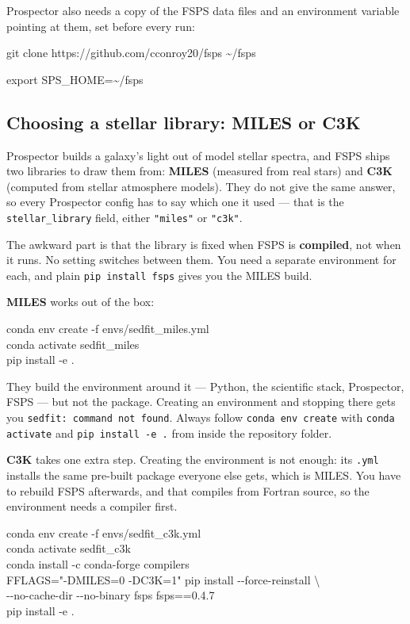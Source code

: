 \documentclass[11pt]{article}
\newcommand{\cmdline}[1]{\begin{cmd}\ttfamily #1\end{cmd}}
\begin{document}
Prospector also needs a copy of the FSPS data files and an environment
variable pointing at them, set before every run:

\cmdline{git clone https://github.com/cconroy20/fsps \textasciitilde/fsps}

\cmdline{export SPS\_HOME=\textasciitilde/fsps}

\subsection{Choosing a stellar library: MILES or C3K}

Prospector builds a galaxy's light out of model stellar spectra, and
FSPS ships two libraries to draw them from: \textbf{MILES} (measured
from real stars) and \textbf{C3K} (computed from stellar atmosphere
models). They do not give the same answer, so every Prospector config
has to say which one it used --- that is the \texttt{stellar\_library}
field, either \texttt{"miles"} or \texttt{"c3k"}.

The awkward part is that the library is fixed when FSPS is
\textbf{compiled}, not when it runs. No setting switches between them.
You need a separate environment for each, and plain
\texttt{pip install fsps} gives you the MILES build.

\textbf{MILES} works out of the box:

\begin{cmd}\ttfamily
conda env create -f envs/sedfit\_miles.yml\\
conda activate sedfit\_miles\\
pip install -e .
\end{cmd}

\begin{warnbox}
They build the environment around it --- Python, the scientific stack,
Prospector, FSPS --- but not the package. Creating an environment and
stopping there gets you \texttt{sedfit: command not found}. Always
follow \texttt{conda env create} with \texttt{conda activate} and
\texttt{pip install -e .} from inside the repository folder.
\end{warnbox}

\textbf{C3K} takes one extra step. Creating the environment is not
enough: its \texttt{.yml} installs the same pre-built package everyone
else gets, which is MILES. You have to rebuild FSPS afterwards, and that
compiles from Fortran source, so the environment needs a compiler first.

\begin{cmd}\ttfamily
conda env create -f envs/sedfit\_c3k.yml\\
conda activate sedfit\_c3k\\
conda install -c conda-forge compilers\\
FFLAGS="-DMILES=0 -DC3K=1" pip install -{}-force-reinstall \textbackslash\\
\hspace*{4em}-{}-no-cache-dir -{}-no-binary fsps fsps==0.4.7\\
pip install -e .
\end{cmd}
\end{document}
